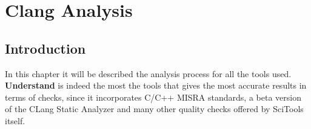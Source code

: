 \chapter{Clang Analysis}

\section{Introduction}

In this chapter it will be described the analysis process for all the tools used.\newline
\textbf{Understand} is indeed the most the tools that gives the most accurate results in terms of checks, since it incorporates C/C++ MISRA standards, a beta version of the CLang Static Analyzer and many other quality checks offered by SciTools itself.\newline
